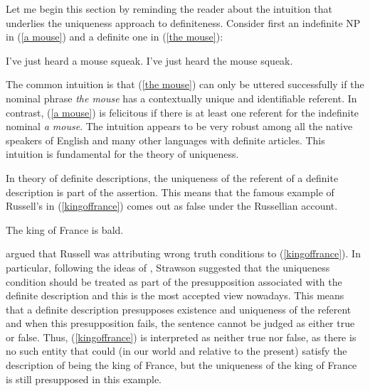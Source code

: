 \documentclass[output=paper,colorlinks,citecolor=brown]{langscibook}
\begin{document}
Let me begin this section by reminding the reader about the intuition that underlies the uniqueness approach to definiteness. Consider first an indefinite NP in (\ref{a mouse}) and a definite one in (\ref{the mouse}): 

\ea 
\ea \label{a mouse}I've just heard a mouse squeak.
\ex \label{the mouse} I've just heard the mouse squeak.
\z
\z

\noindent The common intuition is that (\ref{the mouse}) can only be uttered successfully if the nominal phrase \textit{the mouse} has a contextually unique and identifiable referent. In contrast, (\ref{a mouse}) is felicitous if there is at least one referent for the indefinite nominal \textit{a mouse}. The intuition appears to be very robust among all the native speakers of English and many other languages with definite articles. This intuition is fundamental for the theory of uniqueness. %




In  theory of definite descriptions, the uniqueness of the referent of a definite description is part of the assertion. This means that the famous example of Russell's in (\ref{kingoffrance}) comes out as false under the Russellian account. 

\ea
The king of France is bald. \label{kingoffrance}
\z

\noindent \citet{strawson50} argued that Russell was attributing wrong truth conditions to (\ref{kingoffrance}). In particular, following the ideas of \citet{frege92}, Strawson suggested that the uniqueness condition should be treated as part of the presupposition associated with the definite description and this is the most accepted view nowadays. This means that a definite description presupposes existence and uniqueness of the referent and when this presupposition fails, the sentence cannot be judged as either true or false. Thus, (\ref{kingoffrance}) is interpreted as neither true nor false, as there is no such entity that could (in our world and relative to the present) satisfy the description of being the king of France, but the uniqueness of the king of France is still presupposed in this example.
\end{document}
